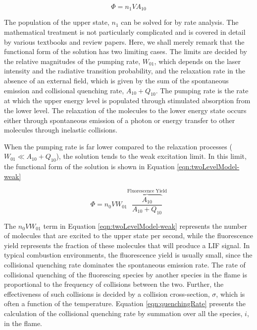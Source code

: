 \begin{equation}
  \Phi = n_1VA_{10}
\end{equation}




The population of the upper state, \(n_1\) can be solved for by rate analysis.
The mathematical treatment is not particularly complicated and is covered in detail by various textbooks and review papers.\cite{1996-eckbreth,1997-daily}
Here, we shall merely remark that the functional form of the solution has two limiting cases.
The limits are decided by the relative magnitudes of the pumping rate, \(W_{01}\), which depends on the laser intensity and the radiative transition probability, and the relaxation rate in the absence of an external field, which is given by the sum of the spontaneous emission and collisional quenching rate, \(A_{10} + Q_{10}\).
The pumping rate is the rate at which the upper energy level is populated through stimulated absorption from the lower level.
The relaxation of the molecules to the lower energy state occurs either through spontaneous emission of a photon or energy transfer to other molecules through inelastic collisions.

When the pumping rate is far lower compared to the relaxation processes (\(W_{01} \ll A_{10} + Q_{10}\)), the solution tends to the weak excitation limit.
In this limit, the functional form of the solution is shown in Equation \ref{eqn:twoLevelModel-weak}

\begin{equation}
  \Phi = n_0 V W_{01}\overbrace{\frac{A_{10}}{A_{10}+Q_{10}}}^{\text{Fluorescence Yield}}
  \label{eqn:twoLevelModel-weak}
\end{equation}


The \(n_0VW_{01}\) term in Equation \ref{eqn:twoLevelModel-weak} represents the number of molecules that are excited to the upper state per second, while the fluorescence yield represents the fraction of these molecules that will produce a LIF signal.
In typical combustion environments, the fluorescence yield is usually small, since the collisional quenching rate dominates the spontaneous emission rate.
The rate of collisional quenching of the fluorescing species by another species in the flame is proportional to the frequency of collisions between the two.
Further, the effectiveness of such collisions is decided by a collision cross-section, \(\sigma\), which is often a function of the temperature.
Equation \ref{eqn:quenchingRate} presents the calculation of the collisional quenching rate by summation over all the species, \(i\), in the flame.

